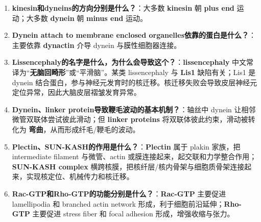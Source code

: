 \documentclass[12pt,fontset=none]{ctexart}
\begin{document}
\begin{enumerate}
\item \textbf{kinesin和dyneins的方向分别是什么？}：大多数 \textbf{kinesin} 朝 \textbf{plus end} 运动；大多数 \textbf{dynein} 朝 \textbf{minus end} 运动。

\item \textbf{Dynein attach to membrane enclosed organelles依靠的蛋白是什么？}：主要依靠 \textbf{dynactin} 介导 dynein 与膜性细胞器连接。

\item \textbf{Lissencephaly的名字是什么，为什么会导致这个？}：\textbf{lissencephaly} 中文常译为“\textbf{无脑回畸形}”或“平滑脑”。某类 lissencephaly 与 \textbf{Lis1} 缺陷有关；Lis1 是 dynein 结合蛋白，参与神经元发育时的核迁移。核迁移失败会导致皮层神经元定位异常，因此大脑皮层褶皱发育异常。

\item \textbf{Dynein、linker protein导致鞭毛波动的基本机制？}：轴丝中 dynein 让相邻微管双联体尝试彼此滑动；但 \textbf{linker proteins} 将双联体彼此约束，滑动被转化为 \textbf{弯曲}，从而形成纤毛/鞭毛的波动。

\item \textbf{Plectin、SUN-KASH的作用是什么？}：\textbf{Plectin} 属于 plakin 家族，把 intermediate filament 与微管、actin 或膜连接起来，起交联和力学整合作用；\textbf{SUN-KASH complex} 横跨核膜，把核纤层/核内骨架与细胞质骨架连接起来，实现核定位、机械传力和核迁移。

\item \textbf{Rac-GTP和Rho-GTP的功能分别是什么？}：\textbf{Rac-GTP} 主要促进 lamellipodia 和 branched actin network 形成，利于细胞前沿延伸；\textbf{Rho-GTP} 主要促进 stress fiber 和 focal adhesion 形成，增强收缩与张力。
\end{enumerate}

\end{document}
